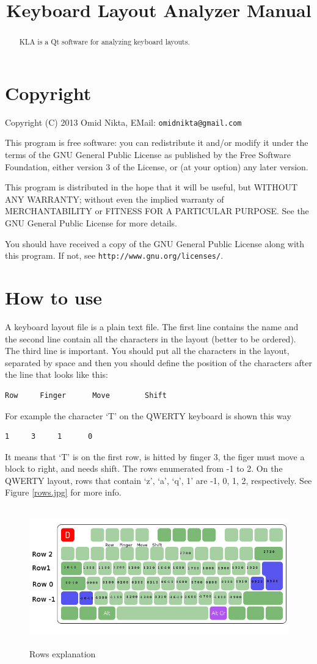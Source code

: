 \documentclass{amsart}
\title{Keyboard Layout Analyzer Manual}
\begin{document}
\maketitle
\begin{abstract}
KLA is a Qt software for analyzing keyboard layouts.
\end{abstract}
\section{Copyright}
Copyright (C) 2013  Omid Nikta, EMail: \verb+omidnikta@gmail.com+

This program is free software: you can redistribute it and/or modify
it under the terms of the GNU General Public License as published by
the Free Software Foundation, either version 3 of the License, or
(at your option) any later version.

This program is distributed in the hope that it will be useful,
but WITHOUT ANY WARRANTY; without even the implied warranty of
MERCHANTABILITY or FITNESS FOR A PARTICULAR PURPOSE.  See the
GNU General Public License for more details.

You should have received a copy of the GNU General Public License
along with this program.  If not, see \verb+http://www.gnu.org/licenses/+.
\section{How to use}
A keyboard layout file is a plain text file. The first line contains the name
and the second line contain all the characters in the layout (better to be ordered). 
The third line is important. You should put all the characters in the layout, separated by space and 
then you should define the position of the characters after the line that looks like this:
\begin{verbatim}
Row 	Finger      Move        Shift
\end{verbatim}
For example the character `T' on the QWERTY keyboard is shown this way
\begin{verbatim}
1     3     1      0
\end{verbatim}
It means that `T' is on the first row, is hitted by finger 3, the figer must move a block to right, and needs shift.
The rows enumerated from -1 to 2. On the QWERTY layout,  rows that contain `z', `a', `q', 1' are -1, 0, 1, 2, respectively. See Figure \ref{rows.jpg} for more info.
\begin{figure}[!ht]
\includegraphics[height=6cm]{rows.jpg}
\caption{Rows explanation}\label{rows}
\end{figure}
\end{document}
